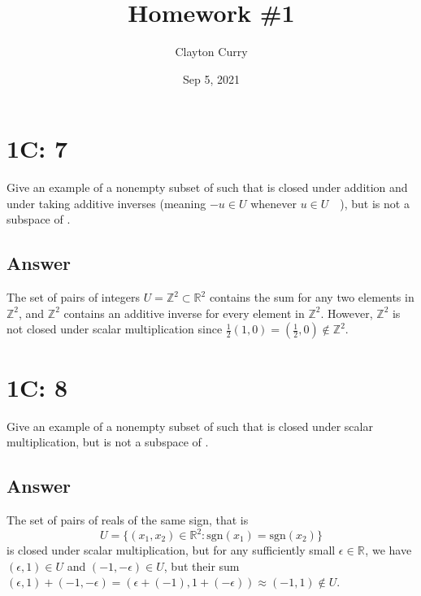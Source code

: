 \documentclass[
	12pt, %
]{fphw}
\title{Homework \#1} %
\author{Clayton Curry} %
\date{Sep 5, 2021} %
\institute{University of Oklahoma \\ Department of Mathematics} %
\newcommand\set[1]{\{#1\}}
\newcommand\R[1]{\text{$\mathbb{R}^{#1}$}}
\newcommand\Z{\text{$\mathbb{Z}$}}
\newcommand\U{\text{$U$ }}
\begin{document}
\maketitle %


\section*{1C: 7}

\begin{problem}
Give an example of a nonempty subset \U of \R{2} such that \U is closed under addition and under taking additive inverses (meaning $-u \in U$ whenever $u \in \U$ ), but \U is not a subspace of \R{2}.
\end{problem}


\subsection*{Answer} 

The set of pairs of integers $U = \Z^2 \subset \R{2}$ contains the sum for any two elements in $\Z^2$, and $\Z^2$ contains an additive inverse for every element in $\Z^2$. However, $\Z^2$ is not closed under scalar multiplication since $\frac{1}{2}(1,0) = (\frac{1}{2},0) \not\in \Z^2$.


\section*{1C: 8}

\begin{problem}
Give an example of a nonempty subset \U of \R{2} such that \U is closed under scalar multiplication, but \U is not a subspace of \R{2}.
\end{problem}


\subsection*{Answer} The set of pairs of reals of the same sign, that is
$$
U = \set{(x_1,x_2) \in \R{2} : \text{sgn}(x_1) = \text{sgn}(x_2)}
$$
is closed under scalar multiplication, but for any sufficiently small $\epsilon \in \R{}$, we have $(\epsilon,1) \in U$ and $(-1, -\epsilon) \in U$, but their sum $(\epsilon, 1) + (-1, -\epsilon) = (\epsilon + (-1), 1 + (-\epsilon)) \approx (-1, 1) \not \in U$.
\end{document}
